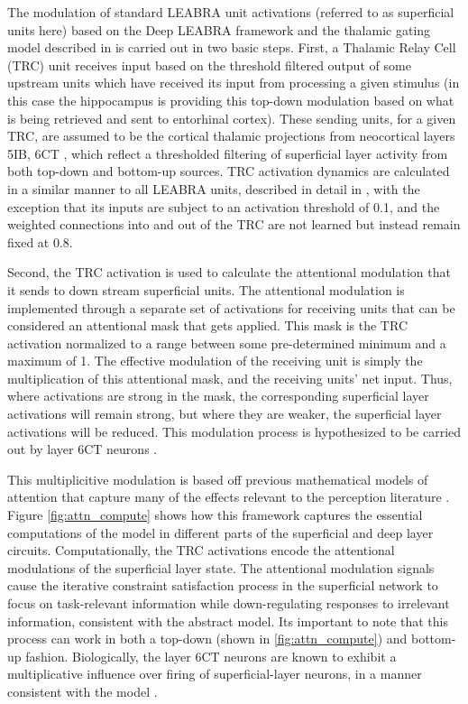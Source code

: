 \documentclass[11pt, titlepage, twoside]{article}
\begin{document}
The modulation of standard LEABRA unit activations (referred to as superficial units here) based on the Deep LEABRA framework and the thalamic gating model described in \textcite{KetzJensenOReilly15} is carried out in two basic steps.  First, a Thalamic Relay Cell (TRC) unit receives input based on the threshold filtered output of some upstream units which have received its input from processing a given stimulus (in this case the hippocampus is providing this top-down modulation based on what is being retrieved and sent to entorhinal cortex).  These sending units, for a given TRC, are assumed to be the cortical thalamic projections from neocortical layers 5IB, 6CT \parencite{ShermanGuillery06}, which reflect a thresholded filtering of superficial layer activity from both top-down and bottom-up sources. TRC activation dynamics are calculated in a similar manner to all LEABRA units, described in detail in \parencite{KetzMorkondaOReilly13}, with the exception that its inputs are subject to an activation threshold of 0.1, and the weighted connections into and out of the TRC are not learned but instead remain fixed at 0.8.  

Second, the TRC activation is used to calculate the attentional modulation that it sends to down stream superficial units.  The attentional modulation is implemented through a separate set of activations for receiving units that can be considered an attentional mask that gets applied.  This mask is the TRC activation normalized to a range between some pre-determined minimum and a maximum of 1.  The effective modulation of the receiving unit is simply the multiplication of this attentional mask, and the receiving units' net input.  Thus, where activations are strong in the mask, the corresponding superficial layer activations will remain strong, but where they are weaker, the superficial layer activations will be reduced.  This modulation process is hypothesized to be carried out by layer 6CT neurons  \parencite{BortoneOlsenScanziani14,OlsenBortoneAdesnikEtAl12}.

This multiplicitive modulation is based off previous mathematical models of attention that capture many of the effects relevant to the perception literature \parencite{ReynoldsHeeger09,MontijnKlinkVanWezel12}.  Figure \ref{fig:attn_compute} shows how this framework captures the essential computations of the \textcite{ReynoldsHeeger09} model in different parts of the superficial and deep layer circuits.  Computationally, the TRC activations encode the attentional modulations of the superficial layer state. The attentional modulation signals cause the iterative constraint satisfaction process in the superficial network to focus on task-relevant information while down-regulating responses to irrelevant information, consistent with the abstract \textcite{ReynoldsHeeger09} model.  Its important to note that this process can work in both a top-down (shown in \ref{fig:attn_compute}) and bottom-up fashion. Biologically, the layer 6CT neurons are known to exhibit a multiplicative influence over firing of superficial-layer neurons, in a manner consistent with the \textcite{ReynoldsHeeger09} model \parencite{BortoneOlsenScanziani14,OlsenBortoneAdesnikEtAl12}. 
\end{document}
